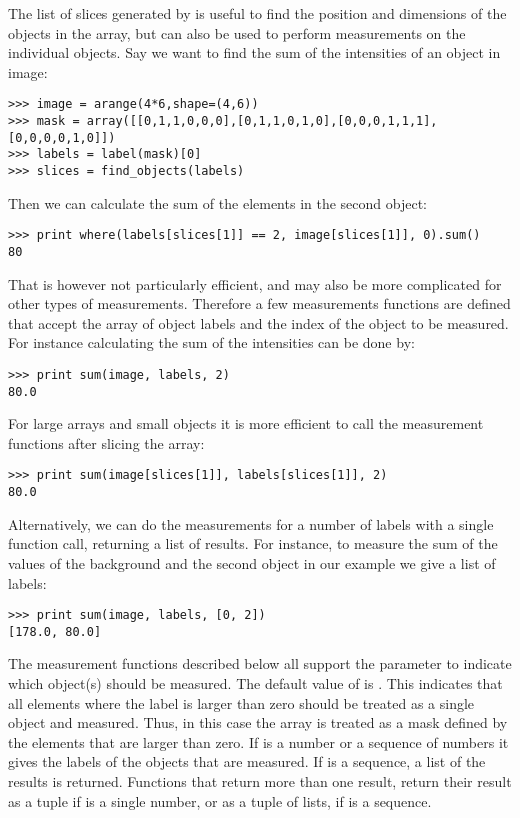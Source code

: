 The list of slices generated by  is useful to find 
the position and dimensions of the objects in the array, but can also be 
used to perform measurements on the individual objects. Say we want to find 
the sum of the intensities of an object in image:
\begin{verbatim}
>>> image = arange(4*6,shape=(4,6))
>>> mask = array([[0,1,1,0,0,0],[0,1,1,0,1,0],[0,0,0,1,1,1],[0,0,0,0,1,0]])
>>> labels = label(mask)[0]
>>> slices = find_objects(labels)
\end{verbatim}
Then we can calculate the sum of the elements in the second object:
\begin{verbatim}
>>> print where(labels[slices[1]] == 2, image[slices[1]], 0).sum()
80
\end{verbatim}
That is however not particularly efficient, and may also be more 
complicated for other types of measurements. Therefore a few measurements 
functions are defined that accept the array of object labels and the index 
of the object to be measured. For instance calculating the sum of the 
intensities can be done by:
\begin{verbatim}
>>> print sum(image, labels, 2)
80.0
\end{verbatim}
For large arrays and small objects it is more efficient to call the 
measurement functions after slicing the array:
\begin{verbatim}
>>> print sum(image[slices[1]], labels[slices[1]], 2)
80.0
\end{verbatim}
Alternatively, we can do the measurements for a number of labels with a 
single function call, returning a list of results. For instance, to measure 
the sum of the values of the background and the second object in our 
example we give a list of labels:
\begin{verbatim}
>>> print sum(image, labels, [0, 2])
[178.0, 80.0]
\end{verbatim}

The measurement functions described below all support the  
parameter to indicate which object(s) should be measured. The default value 
of  is . This indicates that all elements where 
the label is larger than zero should be treated as a single object and 
measured. Thus, in this case the  array is treated as a mask 
defined by the elements that are larger than zero. If  is a 
number or a sequence of numbers it gives the labels of the objects that are 
measured. If  is a sequence, a list of the results is returned. 
Functions that return more than one result, return their result as a tuple 
if  is a single number, or as a tuple of lists, if  
is a sequence.

